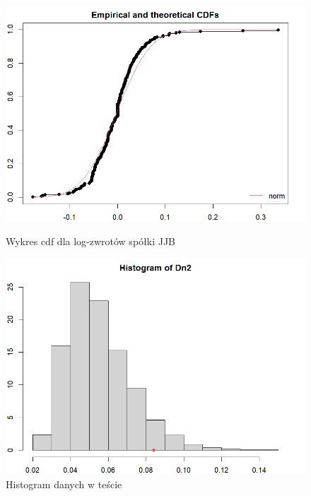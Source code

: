 \documentclass[a4paper,11pt]{article}
\begin{document}
\begin{figure}[!htb]
    \begin{minipage}{0.48\textwidth}
        \centering
        \includegraphics[width=\linewidth]{images/jjb_cdf_log.png}
        \caption{Wykres cdf dla log-zwrotów spółki JJB}
        \label{fig:jjb_cdf_log}
    \end{minipage}\hfill
    \begin{minipage}{0.48\textwidth}
        \centering
        \includegraphics[width=\linewidth]{images/jjb_histMC.png}
        \caption{Histogram danych w teście}
        \label{fig:jjb_histMC}
    \end{minipage}

\end{figure}
\end{document}
